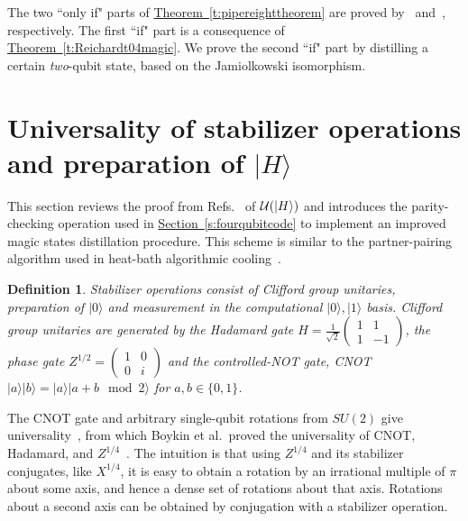 \documentclass[11pt]{article}
\def\ket #1{\vert #1\rangle}
\theoremstyle{note}
\newtheorem{definition}{Definition}
\newcommand{\thmref}[1]{\hyperref[#1]{{Theorem~\ref*{#1}}}}
\newcommand{\secref}[1]{\hyperref[#1]{{Section~\ref*{#1}}}}
\begin{document}
The two ``only if" parts of \thmref{t:pipereighttheorem} are proved by~\cite{VirmaniHuelgaPlenio} and~\cite{BuhrmanCleveLaurentLindenSchrijverUnger06}, respectively.  The first ``if" part is a consequence of \thmref{t:Reichardt04magic}.  We prove the second ``if" part by distilling a certain \emph{two}-qubit state, based on the Jamiolkowski isomorphism.  


\section{Universality of stabilizer operations and preparation of $\ket H$} \label{s:universality}

This section reviews the proof from Refs.~\cite{KnillLaflammeZurekProcRSocLondA98, BravyiKitaev04} of $\magic{\ket H}$ and introduces the parity-checking operation used in \secref{s:fourqubitcode} to implement an improved magic states distillation procedure.  This scheme is similar to the partner-pairing algorithm used in heat-bath algorithmic cooling~\cite{fernandez-2004-2}.

\begin{definition}
Stabilizer operations consist of Clifford group unitaries, preparation of $\ket{0}$ and measurement in the computational $\ket{0}, \ket{1}$ basis.  Clifford group unitaries are generated by the Hadamard gate $H = \tfrac{1}{\sqrt{2}}\left(\begin{smallmatrix}1&1\\1&-1\end{smallmatrix}\right)$, the phase gate $Z^{1/2} = \left(\begin{smallmatrix}1&0\\0&i\end{smallmatrix}\right)$ and the controlled-NOT gate, CNOT $\ket{a} \ket{b} = \ket{a} \ket{a + b \mod 2}$ for $a, b \in \{0,1\}$.  
\end{definition}

The CNOT gate and arbitrary single-qubit rotations from $SU(2)$ give universality~\cite{BarencoBennettCleveDiVincenzoMargolusShorSleatorSmolinWeinfurter95}, from which Boykin et al.\ proved the universality of CNOT, Hadamard, and $Z^{1/4}$~\cite{BoykinMorPulverRoychowdhuryVatan00}.  The intuition is that using $Z^{1/4}$ and its stabilizer conjugates, like $X^{1/4}$, it is easy to obtain a rotation by an irrational multiple of $\pi$ about some axis, and hence a dense set of rotations about that axis.  Rotations about a second axis can be obtained by conjugation with a stabilizer operation.
\end{document}
